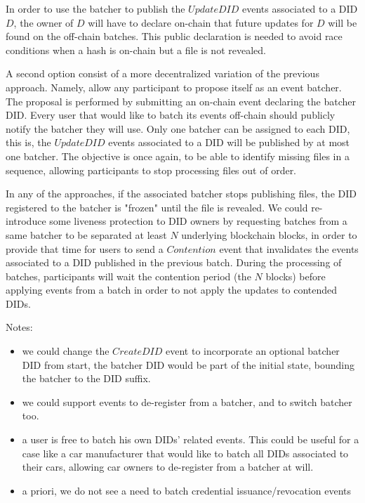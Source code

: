 \documentclass[10pt,a4paper]{article}
\begin{document}
In order to use the batcher to publish the $UpdateDID$ events associated to a DID $D$, the owner of $D$ will have to declare on-chain that future 
updates for $D$ will be found on the off-chain batches. This public declaration is needed to avoid race conditions when a hash is on-chain but
a file is not revealed.

A second option consist of a more decentralized variation of the previous approach. Namely, allow any participant to propose itself as an event 
batcher. The proposal is performed by submitting an on-chain event declaring the batcher DID. Every user that would like to batch its events 
off-chain should publicly notify the batcher they will use. Only one batcher can be assigned to each DID, this is, the $UpdateDID$ events associated 
to a DID will be published by at most one batcher. The objective is once again, to be able to identify missing files in a sequence, allowing 
participants to stop processing files out of order. 

In any of the approaches, if the associated batcher stops publishing files, the DID registered to the batcher is "frozen" until the file is revealed.
We could re-introduce some liveness protection to DID owners by requesting batches from a same batcher to be separated at least $N$ underlying 
blockchain blocks, in order to provide that time for users to send a $Contention$ event that invalidates the events associated to a DID published in
the previous batch. During the processing of batches, participants will wait the contention period (the $N$ blocks) before applying events from a 
batch in order to not apply the updates to contended DIDs.

Notes:
\begin{itemize}
\item we could change the $CreateDID$ event to incorporate an optional batcher DID from start, the batcher DID would be part of the initial state, 
      bounding the batcher to the DID suffix. 
\item we could support events to de-register from a batcher, and to switch batcher too.
\item a user is free to batch his own DIDs' related events. This could be useful for a case like a car manufacturer that would like to batch all DIDs
      associated to their cars, allowing car owners to de-register from a batcher at will.
\item a priori, we do not see a need to batch credential issuance/revocation events
\end{itemize}



\end{document}
